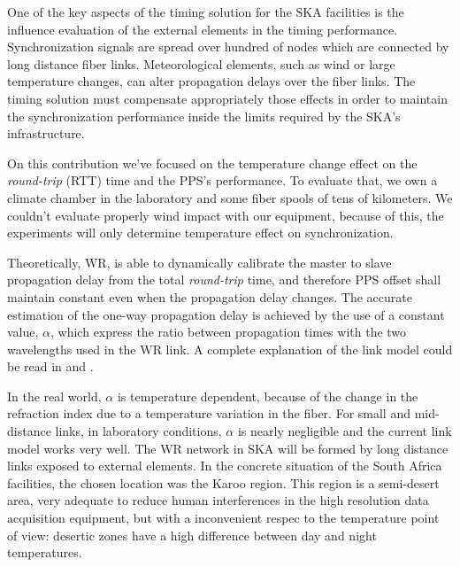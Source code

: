 One of the key aspects of the timing solution for the SKA facilities is the 
influence evaluation of the external elements in the timing performance. 
Synchronization signals are spread over hundred of nodes which are connected by 
long distance fiber links. Meteorological elements, such as wind or large 
 temperature changes, can alter propagation delays over the fiber 
links. The timing solution must compensate appropriately those effects in order 
to maintain the synchronization performance inside the limits required by the 
SKA's infrastructure.

On this contribution we've focused on the temperature change effect on the 
\textit{round-trip} (RTT) time and the PPS's performance. To evaluate that, we 
own a 
climate chamber in the laboratory and some fiber spools of tens of kilometers. 
We couldn't evaluate properly wind impact with our equipment, because of this, 
the experiments will only determine temperature effect on synchronization.


Theoretically, WR, is able to dynamically calibrate the master to slave 
propagation delay from the total \textit{round-trip} time,  and therefore PPS offset shall maintain constant even 
when the propagation delay changes. The accurate estimation of the one-way 
propagation delay is achieved by the use of a constant value, $\alpha$, which 
express the ratio between propagation times with the two wavelengths used in 
the WR link. A complete explanation of the link model could be read in 
\cite{Wlostowski2011} and \cite{Daniluk2012}.

In the real world, $\alpha$ is temperature dependent, because of the change in 
the refraction index due to a temperature variation in the fiber. For small and 
mid-distance links, in laboratory conditions, $\alpha$ is nearly negligible and 
the current link model works very well. The WR network in SKA will be formed by 
long distance links exposed to external elements. In the concrete situation of 
the South Africa facilities, the chosen location was the Karoo region. 
 This region is a 
semi-desert area, very adequate to reduce human interferences in the high 
resolution data acquisition equipment, but with a inconvenient respec to the 
temperature point of view: desertic zones have a high difference between day 
and night temperatures.

